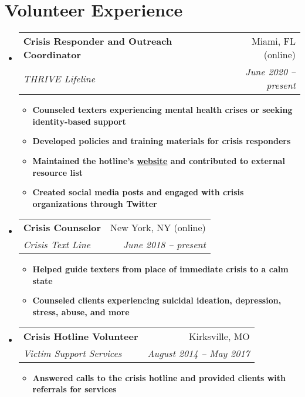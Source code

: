\documentclass[letterpaper,11pt]{article}
\makeatletter
\newcommand{\resumeItem}[2]{
  \item\small{
    \textbf{#1}{ #2 \vspace{-2pt}}
  }
}
\newcommand{\resumeSubheading}[4]{
  \vspace{-1pt}\item
    \begin{tabular*}{0.97\textwidth}[t]{l@{\extracolsep{\fill}}r}
      \textbf{#1} & #2 \\
      \textit{\small#3} & \textit{\small #4} \\
    \end{tabular*}\vspace{-5pt}
}
\newcommand{\resumeSubHeadingListStart}{\begin{itemize}[leftmargin=*]}
\newcommand{\resumeSubHeadingListEnd}{\end{itemize}}
\newcommand{\resumeItemListStart}{\begin{itemize}}
\newcommand{\resumeItemListEnd}{\end{itemize}\vspace{-5pt}}
\makeatother
\begin{document}
\section{Volunteer Experience}
  \resumeSubHeadingListStart

    \resumeSubheading
      {Crisis Responder and Outreach Coordinator}{Miami, FL (online)}
      {THRIVE Lifeline}{June 2020 -- present}
      \resumeItemListStart
        \resumeItem{\textnormal{Counseled texters experiencing mental health crises or seeking identity-based support}}
          {}
        \resumeItem{\textnormal{Developed policies and training materials for crisis responders}}
          {}
        \resumeItem{\textnormal{Maintained the hotline's \href{https://thrivelifeline.org/}{website} and contributed to external resource list}}
          {}
        \resumeItem{\textnormal{Created social media posts and engaged with crisis organizations through Twitter}}
          {}
      \resumeItemListEnd

    \resumeSubheading
      {Crisis Counselor}{New York, NY (online)}
      {Crisis Text Line}{June 2018 -- present}
      \resumeItemListStart
        \resumeItem{\textnormal{Helped guide texters from place of immediate crisis to a calm state}}
          {}
        \resumeItem{\textnormal{Counseled clients experiencing suicidal ideation, depression, stress, abuse, and more}}
          {}
      \resumeItemListEnd

    \resumeSubheading
      {Crisis Hotline Volunteer}{Kirksville, MO}
      {Victim Support Services}{August 2014 -- May 2017}
      \resumeItemListStart
        \resumeItem{\textnormal{Answered calls to the crisis hotline and provided clients with referrals for services}}
          {}
      \resumeItemListEnd
  \resumeSubHeadingListEnd

\end{document}
